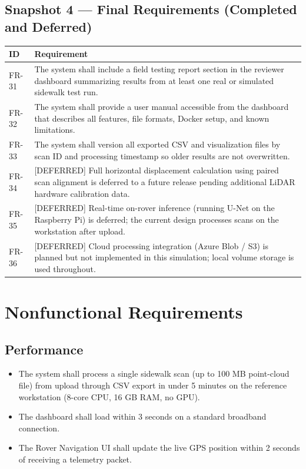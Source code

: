 \documentclass{article}
\begin{document}
\subsection{Snapshot 4 --- Final Requirements (Completed and Deferred)}

\begin{longtable}{|p{0.8in}|p{5.4in}|}
\hline
\textbf{ID} & \textbf{Requirement} \\
\hline
FR-31 & The system shall include a field testing report section in the reviewer dashboard
  summarizing results from at least one real or simulated sidewalk test run. \\
\hline
FR-32 & The system shall provide a user manual accessible from the dashboard that
  describes all features, file formats, Docker setup, and known limitations. \\
\hline
FR-33 & The system shall version all exported CSV and visualization files by scan ID
  and processing timestamp so older results are not overwritten. \\
\hline
FR-34 & [DEFERRED] Full horizontal displacement calculation using paired scan alignment
  is deferred to a future release pending additional LiDAR hardware calibration data. \\
\hline
FR-35 & [DEFERRED] Real-time on-rover inference (running U-Net on the Raspberry Pi)
  is deferred; the current design processes scans on the workstation after upload. \\
\hline
FR-36 & [DEFERRED] Cloud processing integration (Azure Blob / S3) is planned but not
  implemented in this simulation; local volume storage is used throughout. \\
\hline
\end{longtable}


\section{Nonfunctional Requirements}
\label{sec:nonfunctional}


\subsection{Performance}
\begin{itemize}
  \item The system shall process a single sidewalk scan (up to 100 MB point-cloud file)
    from upload through CSV export in under 5 minutes on the reference workstation
    (8-core CPU, 16 GB RAM, no GPU).
  \item The dashboard shall load within 3 seconds on a standard broadband connection.
  \item The Rover Navigation UI shall update the live GPS position within 2 seconds of
    receiving a telemetry packet.
\end{itemize}
\end{document}
